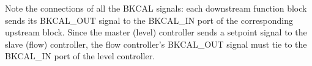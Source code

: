 Note the connections of all the BKCAL signals: each downstream function block sends its BKCAL\_OUT signal to the BKCAL\_IN port of the corresponding upstream block.  Since the master (level) controller sends a setpoint signal to the slave (flow) controller, the flow controller's BKCAL\_OUT signal must tie to the BKCAL\_IN port of the level controller.



